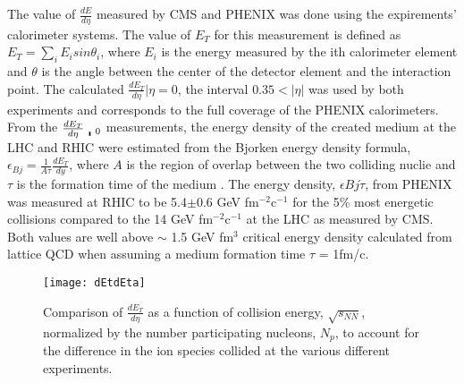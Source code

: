       The value of $\frac{dE}{d\eta}$ measured by CMS \cite{cmsEt} and PHENIX 
        \cite{phenixDeDeta} was done using the expirements' calorimeter systems.
      The value of $E_{T}$ for this measurement is defined as 
        $E_{T}=\sum_{i}E_{i}sin\theta_{i}$, where $E_{i}$ is the energy measured 
        by the ith calorimeter element and $\theta$ is the angle between the 
        center of the detector element and the interaction point. 
      The calculated $\frac{dE_{T}}{d\eta}|{\eta=0}$, the interval 
        $0.35<|\eta|$ was used by both experiments and corresponds to the full
        coverage of the PHENIX calorimeters. 
      From the $\frac{dE_{T}}{d\eta}\bracevert_{0}$ measurements, the energy 
        density of the created medium at the LHC and RHIC were estimated from the
        Bjorken energy density formula, 
        $\epsilon_{Bj}=\frac{1}{A\tau}\frac{dE_{T}}{dy}$, where $A$ is the region
        of overlap between the two colliding nuclie and $\tau$ is the formation
        time of the medium \cite{bjEdense}.
      The energy density, $\epsilon{Bj}\dot\tau$, from PHENIX was measured at
        RHIC to be 5.4$\pm$0.6 GeV fm$^{-2}$c$^{-1}$ for the 5\% most energetic 
        collisions compared to the 14 GeV fm$^{-2}$c$^{-1}$ at the LHC as 
        measured by CMS. 
      Both values are well above $\sim$ 1.5 GeV fm$^{3}$ critical energy density
        calculated from lattice QCD when assuming a medium formation time $\tau$ 
        = 1fm/c.
        \begin{figure}[!Hhbt]
          \centering
          \texttt{[image: dEtdEta]}
          \caption{Comparison of $\frac{dE_{T}}{d\eta}$ as a function of 
            collision energy, $\sqrt{s_{NN}}$, normalized by the number 
            participating nucleons, $N_{p}$, to account for the difference in 
            the ion species collided at the various different experiments.}
          \label{fig:dEtdEta}
        \end{figure}
  
